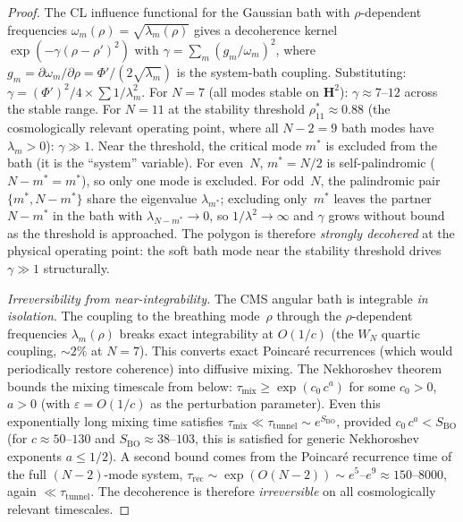 \begin{proof}
The CL influence functional for the Gaussian bath
with $\rho$-dependent frequencies $\omega_m(\rho)
= \sqrt{\lambda_m(\rho)}$ gives a decoherence kernel
$\exp(-\gamma(\rho{-}\rho')^2)$ with
$\gamma = \sum_m (g_m/\omega_m)^2$, where
$g_m = \partial\omega_m/\partial\rho
= \Phi'/(2\sqrt{\lambda_m})$ is the system-bath coupling.
Substituting: $\gamma = (\Phi')^2/4 \times
\sum 1/\lambda_m^2$.
For $N = 7$ (all modes stable on $\mathbf{H}^2$):
$\gamma \approx 7$--$12$ across the stable range.
For $N = 11$ at the stability threshold
$\rho^*_{11} \approx 0.88$ (the cosmologically relevant
operating point, where all $N{-}2 = 9$ bath modes
have $\lambda_m > 0$): $\gamma \gg 1$.
Near the threshold, the critical mode $m^*$ is excluded
from the bath (it is the ``system'' variable).
For even~$N$, $m^* = N/2$ is self-palindromic
($N - m^* = m^*$), so only one mode is excluded.
For odd~$N$, the palindromic pair $\{m^*, N{-}m^*\}$
share the eigenvalue $\lambda_{m^*}$;
excluding only~$m^*$ leaves the partner $N{-}m^*$
in the bath with $\lambda_{N-m^*} \to 0$,
so $1/\lambda^2 \to \infty$ and
$\gamma$ grows without bound as the threshold is
approached.
The polygon is therefore \emph{strongly decohered}
at the physical operating point: the soft bath mode
near the stability threshold drives $\gamma \gg 1$
structurally.

\emph{Irreversibility from near-integrability.}
The CMS angular bath is integrable \emph{in isolation}.
The coupling to the breathing mode~$\rho$ through the
$\rho$-dependent frequencies $\lambda_m(\rho)$
breaks exact integrability at $O(1/c)$
(the $W_N$ quartic coupling,
$\sim\!2\%$ at $N = 7$).
This converts exact Poincar\'e recurrences
(which would periodically restore coherence)
into diffusive mixing.
The Nekhoroshev theorem bounds the mixing
timescale from below:
$\tau_{\mathrm{mix}} \ge
\exp(c_0\,c^{a})$ for some $c_0 > 0$, $a > 0$
(with $\varepsilon = O(1/c)$ as the perturbation
parameter).
Even this exponentially long mixing time satisfies
$\tau_{\mathrm{mix}} \ll \tau_{\mathrm{tunnel}}
\sim e^{S_{\mathrm{BO}}}$,
provided $c_0\,c^a < S_{\mathrm{BO}}$
(for $c \approx 50$--$130$ and
$S_{\mathrm{BO}} \approx 38$--$103$, this is
satisfied for generic Nekhoroshev exponents
$a \le 1/2$).
A second bound comes from the Poincar\'e recurrence time
of the full $(N{-}2)$-mode system,
$\tau_{\mathrm{rec}} \sim \exp(O(N{-}2))
\sim e^5$--$e^9 \approx 150$--$8000$,
again $\ll \tau_{\mathrm{tunnel}}$.
The decoherence is therefore \emph{irreversible}
on all cosmologically relevant timescales.


\end{proof}
